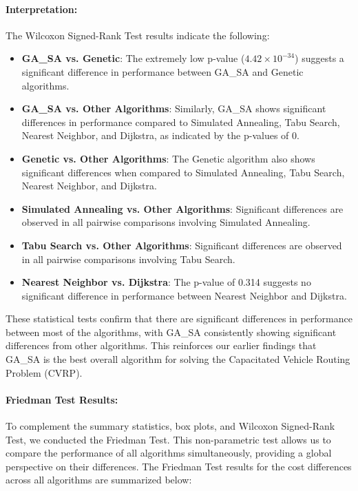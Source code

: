\documentclass[
]{article}
\begin{document}
    \paragraph{Interpretation:}
    The Wilcoxon Signed-Rank Test results indicate the following:

    \begin{itemize}
        \item \textbf{GA\_SA vs. Genetic}: The extremely low p-value (\(4.42 \times 10^{-34}\)) suggests a significant difference in performance between GA\_SA and Genetic algorithms.
        \item \textbf{GA\_SA vs. Other Algorithms}: Similarly, GA\_SA shows significant differences in performance compared to Simulated Annealing, Tabu Search, Nearest Neighbor, and Dijkstra, as indicated by the p-values of 0.
        \item \textbf{Genetic vs. Other Algorithms}: The Genetic algorithm also shows significant differences when compared to Simulated Annealing, Tabu Search, Nearest Neighbor, and Dijkstra.
        \item \textbf{Simulated Annealing vs. Other Algorithms}: Significant differences are observed in all pairwise comparisons involving Simulated Annealing.
        \item \textbf{Tabu Search vs. Other Algorithms}: Significant differences are observed in all pairwise comparisons involving Tabu Search.
        \item \textbf{Nearest Neighbor vs. Dijkstra}: The p-value of 0.314 suggests no significant difference in performance between Nearest Neighbor and Dijkstra.
    \end{itemize}

    These statistical tests confirm that there are significant differences in performance between most of the algorithms, with GA\_SA consistently showing significant differences from other algorithms. This reinforces our earlier findings that GA\_SA is the best overall algorithm for solving the Capacitated Vehicle Routing Problem (CVRP).

    \paragraph{Friedman Test Results:}
    To complement the summary statistics, box plots, and Wilcoxon Signed-Rank Test, we conducted the Friedman Test.
    This non-parametric test allows us to compare the performance of all algorithms simultaneously, providing a global perspective on their differences.
    The Friedman Test results for the cost differences across all algorithms are summarized below:
\end{document}
